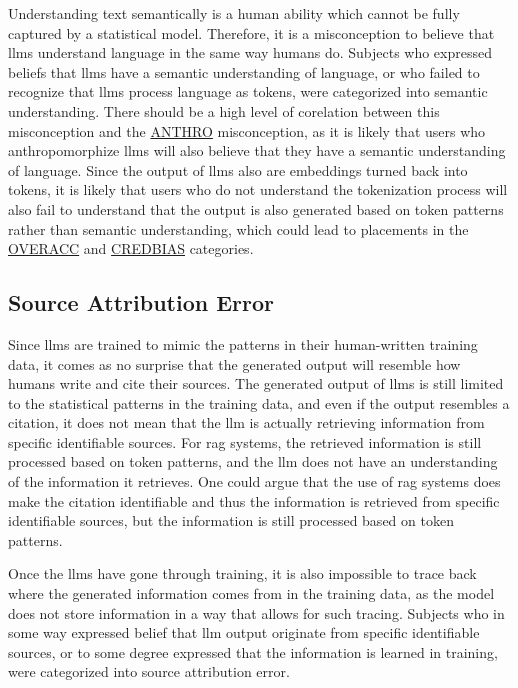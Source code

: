 Understanding text semantically is a human ability which cannot be fully captured by a statistical model. Therefore, it is a misconception to believe that \gls{llms} understand language in the same way humans do. Subjects who expressed beliefs that \gls{llms} have a semantic understanding of language, or who failed to recognize that \gls{llms} process language as tokens, were categorized into semantic understanding. There should be a high level of corelation between this misconception and the \hyperref[anthro]{ANTHRO} misconception, as it is likely that users who anthropomorphize \gls{llms} will also believe that they have a semantic understanding of language. 
Since the output of \gls{llms} also are embeddings turned back into tokens, it is likely that users who do not understand the tokenization process will also fail to understand that the output is also generated based on token patterns rather than semantic understanding, which could lead to placements in the \hyperref[overacc]{OVERACC} and \hyperref[credbias]{CREDBIAS} categories.

\subsection{Source Attribution Error}\label{sourceattr}
Since \gls{llms} are trained to mimic the patterns in their human-written training data, it comes as no surprise that the generated output will resemble how humans write and cite their sources. The generated output of \gls{llms} is still limited to the statistical patterns in the training data, and even if the output resembles a citation, it does not mean that the \gls{llm} is actually retrieving information from specific identifiable sources. For \gls{rag} systems, the retrieved information is still processed based on token patterns, and the \gls{llm} does not have an understanding of the information it retrieves. One could argue that the use of \gls{rag} systems does make the citation identifiable and thus the information is retrieved from specific identifiable sources, but the information is still processed based on token patterns. 

Once the \gls{llms} have gone through training, it is also impossible to trace back where the generated information comes from in the training data, as the model does not store information in a way that allows for such tracing. Subjects who in some way expressed belief that \gls{llm} output originate from specific identifiable sources, or to some degree expressed that the information is learned in training, were categorized into source attribution error.


